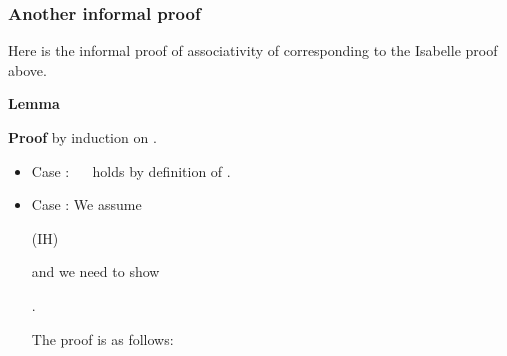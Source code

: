 \begin{isabellebody}
\begin{isamarkuptext}
\subsubsection{Another informal proof}

Here is the informal proof of associativity of 
corresponding to the Isabelle proof above.
\bigskip

\noindent
\textbf{Lemma} 

\noindent
\textbf{Proof} by induction on .
\begin{itemize}
\item Case : \  
  \mbox{} \ holds by definition of .
\item Case : We assume
  \begin{center} \hfill {} 
   \hfill (IH) \end{center}
  and we need to show
  \begin{center} .\end{center}
  The proof is as follows:\smallskip


\end{itemize}
\end{isamarkuptext}
\end{isabellebody}
